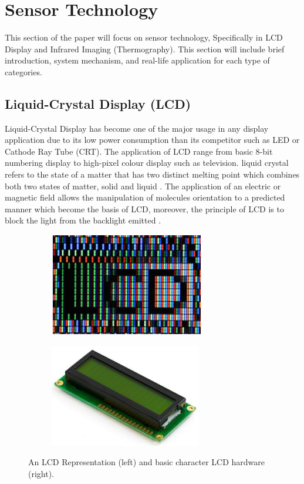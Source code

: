 \justifying
\noindent

\section{Sensor Technology}
This section of the paper will focus on sensor technology, Specifically in LCD Display and Infrared Imaging (Thermography). This section will include brief introduction, system mechanism, and real-life application for each type of categories. \\

\subsection{Liquid-Crystal Display (LCD)}
\noindent Liquid-Crystal Display has become one of the major usage in any display application due to its low power consumption than its competitor such as LED or Cathode Ray Tube (CRT). The application of LCD range from basic 8-bit numbering display to high-pixel colour display such as television. liquid crystal refers to the state of a matter that has two distinct melting point which combines both two states of matter, solid and liquid \cite{AnonymousLCDApplications}\cite{Gurski2005DisplayOverview}. The application of an electric or magnetic field allows the manipulation of molecules orientation to a predicted manner which become the basis of LCD, moreover, the principle of LCD is to block the light from the backlight emitted \cite{Gurski2005DisplayOverview}.\\

\begin{figure}[!ht]
\centering
%    
  \begin{subfigure}[b]{0.4\textwidth}
    \includegraphics[height=4.5cm]{Figures/LCD_general.PNG}
  \end{subfigure}
  \begin{subfigure}[b]{0.4\textwidth}
    \includegraphics[height=4.5cm]{Figures/LCD_BASIC.jpg}
  \end{subfigure}
%  
  \caption{An LCD Representation \cite{Gurski2005DisplayOverview} (left) and basic character LCD hardware \cite{AnonymousBasicSystems} (right).}
    \label{fig:basic lcd}
\end{figure}

